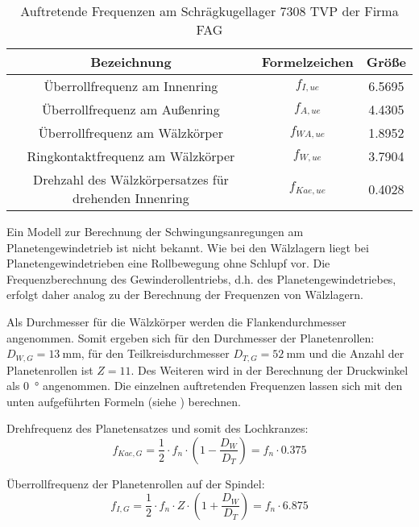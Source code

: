 \begin{table}[h]
\centering
\begin{tabular}{ccc}\toprule
Bezeichnung & Formelzeichen & Größe \\
\midrule
Überrollfrequenz am Innenring & $f_{I, ue}$ & \num{6.5695} \\
Überrollfrequenz am Außenring & $f_{A, ue}$ & \num{4.4305} \\
Überrollfrequenz am Wälzkörper & $f_{WA, ue}$ & \num{1.8952} \\
Ringkontaktfrequenz am Wälzkörper & $f_{W, ue}$ & \num{3.7904} \\
Drehzahl des Wälzkörpersatzes für drehenden Innenring & $f_{Kae, ue}$ & \num{0.4028} \\
\bottomrule
\end{tabular}
\caption{Auftretende Frequenzen am Schrägkugellager 7308 TVP der Firma FAG}
\label{tab:Frequenzen_am_Schraegkugellager_7308_TVP}
\end{table}

Ein Modell zur Berechnung der Schwingungsanregungen am Planetengewindetrieb ist nicht bekannt. Wie bei den Wälzlagern liegt bei Planetengewindetrieben eine Rollbewegung ohne Schlupf vor. Die Frequenzberechnung des Gewinderollentriebs, d.h. des Planetengewindetriebes, erfolgt daher analog zu der Berechnung der Frequenzen von Wälzlagern.


Als Durchmesser für die Wälzkörper werden die Flankendurchmesser angenommen. Somit ergeben sich für den Durchmesser der Planetenrollen: $D_{W, G} = \SI{13}{\milli\meter}$, für den Teilkreisdurchmesser $ D_{T, G} = \SI{52}{\milli\meter} $ und die Anzahl der Planetenrollen ist $Z = 11$. Des Weiteren wird in der Berechnung der Druckwinkel als \SI{0}{\degree} angenommen. Die einzelnen auftretenden Frequenzen lassen sich mit den unten aufgeführten Formeln (siehe \cite{Sturm1986}) berechnen.


Drehfrequenz des Planetensatzes und somit des Lochkranzes:
\begin{equation}
f_{Kae, G} = \frac{1}{2} \cdot f_{n} \cdot \left( 1-\frac{D_{W}}{D_{T}} \right) = f_{n} \cdot \num{0.375}
\end{equation}

Überrollfrequenz der Planetenrollen auf der Spindel:
\begin{equation}
f_{I, G} = \frac{1}{2} \cdot f_{n} \cdot Z \cdot \left( 1+\frac{D_{W}}{D_{T}} \right) = f_{n} \cdot \num{6.875}
\end{equation}

